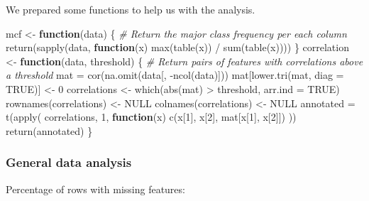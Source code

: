 \documentclass[
]{article}
\newenvironment{Shaded}{\begin{snugshade}}{\end{snugshade}}
\newcommand{\AttributeTok}[1]{\textcolor[rgb]{0.77,0.63,0.00}{#1}}
\newcommand{\CommentTok}[1]{\textcolor[rgb]{0.56,0.35,0.01}{\textit{#1}}}
\newcommand{\ConstantTok}[1]{\textcolor[rgb]{0.00,0.00,0.00}{#1}}
\newcommand{\ControlFlowTok}[1]{\textcolor[rgb]{0.13,0.29,0.53}{\textbf{#1}}}
\newcommand{\DecValTok}[1]{\textcolor[rgb]{0.00,0.00,0.81}{#1}}
\newcommand{\FunctionTok}[1]{\textcolor[rgb]{0.00,0.00,0.00}{#1}}
\newcommand{\NormalTok}[1]{#1}
\newcommand{\OtherTok}[1]{\textcolor[rgb]{0.56,0.35,0.01}{#1}}
\newcommand{\SpecialCharTok}[1]{\textcolor[rgb]{0.00,0.00,0.00}{#1}}
\begin{document}
We prepared some functions to help us with the analysis.

\begin{Shaded}
\begin{Highlighting}[]
\NormalTok{mcf }\OtherTok{\textless{}{-}} \ControlFlowTok{function}\NormalTok{(data) \{}
    \CommentTok{\#\textquotesingle{} Return the major class frequency per each column}
    \FunctionTok{return}\NormalTok{(}\FunctionTok{sapply}\NormalTok{(data, }\ControlFlowTok{function}\NormalTok{(x) }\FunctionTok{max}\NormalTok{(}\FunctionTok{table}\NormalTok{(x)) }\SpecialCharTok{/} \FunctionTok{sum}\NormalTok{(}\FunctionTok{table}\NormalTok{(x))))}
\NormalTok{\}}
\NormalTok{correlation }\OtherTok{\textless{}{-}} \ControlFlowTok{function}\NormalTok{(data, threshold) \{}
    \CommentTok{\#\textquotesingle{} Return pairs of features with correlations above a threshold}
\NormalTok{    mat }\OtherTok{=} \FunctionTok{cor}\NormalTok{(}\FunctionTok{na.omit}\NormalTok{(data[, }\SpecialCharTok{{-}}\FunctionTok{ncol}\NormalTok{(data)]))}
\NormalTok{    mat[}\FunctionTok{lower.tri}\NormalTok{(mat, }\AttributeTok{diag =} \ConstantTok{TRUE}\NormalTok{)] }\OtherTok{\textless{}{-}} \DecValTok{0}
\NormalTok{    correlations }\OtherTok{\textless{}{-}} \FunctionTok{which}\NormalTok{(}\FunctionTok{abs}\NormalTok{(mat) }\SpecialCharTok{\textgreater{}}\NormalTok{ threshold, }\AttributeTok{arr.ind =} \ConstantTok{TRUE}\NormalTok{)}
    \FunctionTok{rownames}\NormalTok{(correlations) }\OtherTok{\textless{}{-}} \ConstantTok{NULL}
    \FunctionTok{colnames}\NormalTok{(correlations) }\OtherTok{\textless{}{-}} \ConstantTok{NULL}
\NormalTok{    annotated }\OtherTok{=} \FunctionTok{t}\NormalTok{(}\FunctionTok{apply}\NormalTok{(}
\NormalTok{        correlations,}
        \DecValTok{1}\NormalTok{,}
        \ControlFlowTok{function}\NormalTok{(x) }\FunctionTok{c}\NormalTok{(x[}\DecValTok{1}\NormalTok{], x[}\DecValTok{2}\NormalTok{], mat[x[}\DecValTok{1}\NormalTok{], x[}\DecValTok{2}\NormalTok{]])}
\NormalTok{    ))}
    \FunctionTok{return}\NormalTok{(annotated)}
\NormalTok{\}}
\end{Highlighting}
\end{Shaded}

\hypertarget{general-data-analysis}{%
\subsubsection{General data analysis}\label{general-data-analysis}}

Percentage of rows with missing features:
\end{document}
